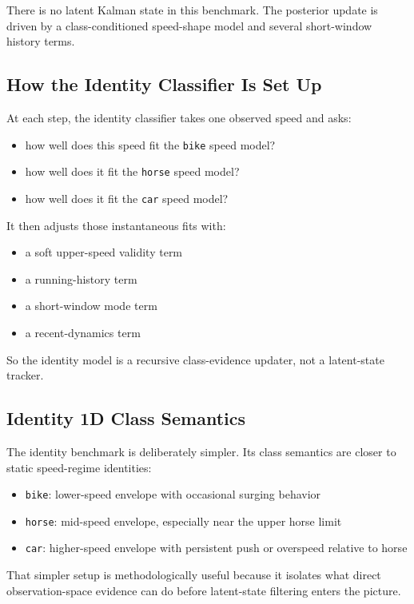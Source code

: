 \documentclass[11pt]{article}
\begin{document}
There is no latent Kalman state in this benchmark. The posterior update is
driven by a class-conditioned speed-shape model and several short-window
history terms.

\subsection{How the Identity Classifier Is Set Up}

At each step, the identity classifier takes one observed speed and asks:
\begin{itemize}[leftmargin=1.5em]
    \item how well does this speed fit the \texttt{bike} speed model?
    \item how well does it fit the \texttt{horse} speed model?
    \item how well does it fit the \texttt{car} speed model?
\end{itemize}

It then adjusts those instantaneous fits with:
\begin{itemize}[leftmargin=1.5em]
    \item a soft upper-speed validity term
    \item a running-history term
    \item a short-window mode term
    \item a recent-dynamics term
\end{itemize}

So the identity model is a recursive class-evidence updater, not a latent-state
tracker.

\subsection{Identity 1D Class Semantics}

The identity benchmark is deliberately simpler. Its class semantics are closer
to static speed-regime identities:
\begin{itemize}[leftmargin=1.5em]
    \item \texttt{bike}: lower-speed envelope with occasional surging behavior
    \item \texttt{horse}: mid-speed envelope, especially near the upper horse
    limit
    \item \texttt{car}: higher-speed envelope with persistent push or overspeed
    relative to horse
\end{itemize}

That simpler setup is methodologically useful because it isolates what direct
observation-space evidence can do before latent-state filtering enters the
picture.
\end{document}
